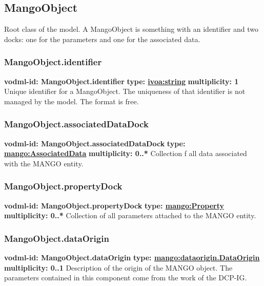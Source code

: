   \subsection{MangoObject}
  \label{sect:MangoObject}
    Root class of the model. A MangoObject is something with an identifier and two docks: one for the parameters and one for the associated data.

    \subsubsection{MangoObject.identifier}
      \textbf{vodml-id: MangoObject.identifier} \newline
      \textbf{type: \hyperref[sect:ivoa]{ivoa:string}} \newline
      \textbf{multiplicity: 1} \newline 
      Unique identifier for a MangoObject. The uniqueness of that identifier is not managed by the model. The format is free.

    \subsubsection{MangoObject.associatedDataDock}
      \textbf{vodml-id: MangoObject.associatedDataDock} \newline
      \textbf{type: \hyperref[sect:AssociatedData]{mango:AssociatedData}} \newline
      \textbf{multiplicity: 0..*} \newline 
      Collection f all data associated with the MANGO entity.

    \subsubsection{MangoObject.propertyDock}
      \textbf{vodml-id: MangoObject.propertyDock} \newline
      \textbf{type: \hyperref[sect:Property]{mango:Property}} \newline
      \textbf{multiplicity: 0..*} \newline 
      Collection of all parameters attached to the MANGO entity.

    \subsubsection{MangoObject.dataOrigin}
      \textbf{vodml-id: MangoObject.dataOrigin} \newline
      \textbf{type: \hyperref[sect:dataorigin.DataOrigin]{mango:dataorigin.DataOrigin}} \newline
      \textbf{multiplicity: 0..1} \newline 
      Description of the origin of the MANGO object. The parameters contained in this component come from the work of the DCP-IG.

